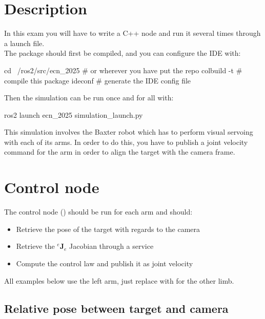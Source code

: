 \documentclass{ecnreport}
\begin{document}



\section{Description}

In this exam you will have to write a C++ node and run it several times through a launch file.\\

The package should first be compiled, and you can configure the IDE with:
\begin{bashcodelarge}
 cd ~/ros2/src/ecn_2025 # or wherever you have put the repo
 colbuild -t            # compile this package
 ideconf                # generate the IDE config file
\end{bashcodelarge}

Then the simulation can be run once and for all with:
\begin{bashcodelarge}
 ros2 launch ecn_2025 simulation_launch.py
\end{bashcodelarge}

This simulation involves the Baxter robot which has to perform visual servoing with each of its arms.
In order to do this, you have to publish a joint velocity command for the arm in order to align the target with the camera frame.


\section{Control node}

The control node () should be run for each arm and should:
\begin{itemize}
 \item Retrieve the  pose of the target with regards to the camera
 \item Retrieve the ${}^e\mathbf{J}_e$ Jacobian through a service
 \item Compute the control law and publish it as joint velocity
\end{itemize}

All examples below use the left arm, just replace with  for the other limb.

\subsection{Relative pose between target and camera}
\end{document}
